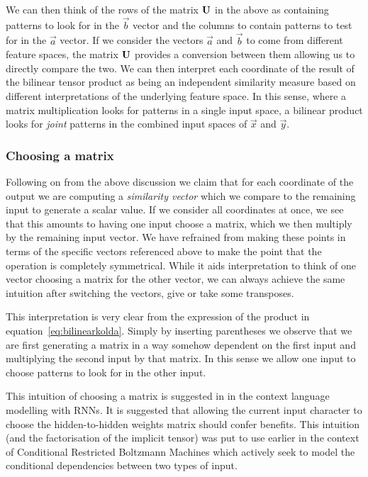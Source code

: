 We can then think of the rows of the matrix \(\mathbf{U}\) in the
above as containing patterns to look for in the \(\vec{b}\) vector and the columns to
contain patterns to test for in the \(\vec{a}\) vector. If we consider the vectors 
\(\vec{a}\) and \(\vec{b}\) to come from different feature spaces, the matrix \(\mathbf{U}\)
provides a conversion between them allowing us to directly compare the two. We can then
interpret each coordinate of the result of the bilinear tensor product as being an
independent similarity measure based on different interpretations of the underlying
feature space. In this sense, where a matrix multiplication looks for patterns in a single input
space, a bilinear product looks for \emph{joint} patterns in the combined input spaces of
\(\vec{x}\) and \(\vec{y}\).


\subsubsection{Choosing a matrix}
Following on from the above discussion we claim that for each coordinate of the output we are
computing a \emph{similarity vector} which we compare to the remaining input to generate a
scalar value. If we consider all coordinates at once, we see that this amounts to having
one input choose a matrix, which we then multiply by the remaining input vector. We have
refrained from making these points in terms of the specific vectors referenced above to make
the point that the operation is completely symmetrical. While it aids interpretation to think
of one vector choosing a matrix for the other vector, we can always achieve the same
intuition after switching the vectors, give or take some transposes.

This interpretation is very clear from the expression of the product in
equation~\ref{eq:bilinearkolda}. Simply by inserting parentheses we observe that we are
first generating a matrix in a way somehow dependent on the first input and multiplying
the second input by that matrix. In this sense we allow one input to choose patterns to look for
in the other input.

This intuition of choosing a matrix is suggested in \autocite{Sutskever2013} in the
context language modelling with RNNs. It is suggested that allowing the current input
character to choose the hidden-to-hidden weights matrix should confer benefits. 
This intuition (and the factorisation of the implicit tensor) was put to use earlier in the context
of Conditional Restricted Boltzmann Machines \autocite{Taylor} which actively seek to model the
conditional dependencies between two types of input.

